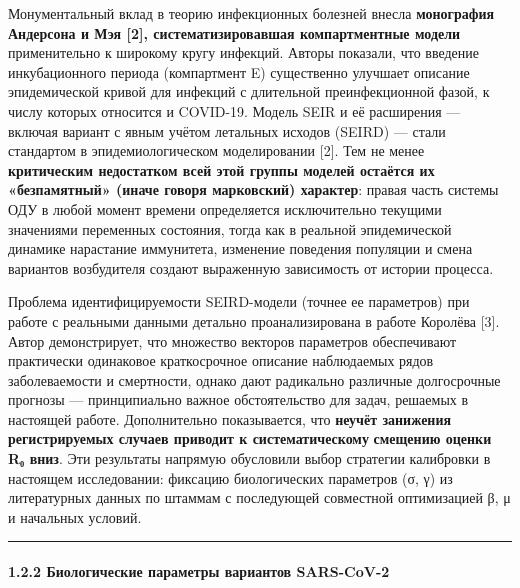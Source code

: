 \documentclass[12pt]{article}
\begin{document}
Монументальный вклад в теорию инфекционных болезней внесла
\textbf{монография} \textbf{Андерсона и Мэя {[}2{]}, систематизировавшая
компартментные модели} применительно к широкому кругу инфекций. Авторы
показали, что введение инкубационного периода (компартмент E)
существенно улучшает описание эпидемической кривой для инфекций с
длительной преинфекционной фазой, к числу которых относится и COVID-19.
Модель SEIR и её расширения --- включая вариант с явным учётом летальных
исходов (SEIRD) --- стали стандартом в эпидемиологическом моделировании
{[}2{]}. Тем не менее \textbf{критическим недостатком всей этой группы
моделей остаётся их} \textbf{«безпамятный» (иначе говоря марковский)
характер}: правая часть системы ОДУ в любой момент времени определяется
исключительно текущими значениями переменных состояния, тогда как в
реальной эпидемической динамике нарастание иммунитета, изменение
поведения популяции и смена вариантов возбудителя создают выраженную
зависимость от истории процесса.

Проблема идентифицируемости SEIRD-модели (точнее ее параметров) при
работе с реальными данными детально проанализирована в работе Королёва
{[}3{]}. Автор демонстрирует, что множество векторов параметров
обеспечивают практически одинаковое краткосрочное описание наблюдаемых
рядов заболеваемости и смертности, однако дают радикально различные
долгосрочные прогнозы --- принципиально важное обстоятельство для задач,
решаемых в настоящей работе. Дополнительно показывается, что
\textbf{неучёт занижения регистрируемых случаев приводит к
систематическому} \textbf{смещению оценки R₀ вниз}. Эти результаты
напрямую обусловили выбор стратегии калибровки в настоящем исследовании:
фиксацию биологических параметров (σ, γ) из литературных данных по
штаммам с последующей совместной оптимизацией β, μ и начальных условий.

\begin{center}\rule{0.5\linewidth}{0.5pt}\end{center}

\paragraph{1.2.2 Биологические параметры вариантов
SARS-CoV-2}\label{ux431ux438ux43eux43bux43eux433ux438ux447ux435ux441ux43aux438ux435-ux43fux430ux440ux430ux43cux435ux442ux440ux44b-ux432ux430ux440ux438ux430ux43dux442ux43eux432-sars-cov-2}
\end{document}
